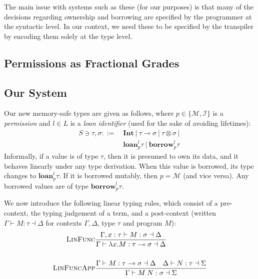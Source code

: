 \documentclass{article}
\renewcommand\em{\bfseries}
\newcommand{\agap}{\hspace{0.25em}}
\newcommand{\lolly}{\multimap}
\newcommand{\judge}[3]{\textsc{#1}&\frac{#2}{#3}}
\newcommand{\loan}{\textbf{loan}}
\newcommand{\borrow}{\textbf{borrow}}
\begin{document}

The main issue with systems such as these (for our purposes) is that many of the decisions regarding ownership and borrowing are specified by the programmer at the syntactic level. In our context, we need these to be specified by the transpiler by encoding them solely at the type level. 



\subsection{Permissions as Fractional Grades}

\subsection{Our System}

Our new memory-safe types are given as follows, where $p \in \{\mathcal{M}, \mathcal{I} \}$ is a \emph{permission} and $l \in L$ is a \emph{loan identifier} (used for the sake of avoiding lifetimes):
\begin{align*}
    S \ni \tau, \sigma ::=~  &\textbf{Int} ~|~ \tau \lolly \sigma ~|~ \tau \otimes \sigma ~|~ \\
    & \loan^{l}_{p} \tau ~|~ \borrow^{l}_{p} \tau
\end{align*}
Informally, if a value is of type $\tau$, then it is presumed to own its data, and it behaves linearly under any type derivation. When this value is borrowed, its type changes to $\loan_{p}^{l} \tau$. If it is borrowed mutably, then $p = \mathcal{M}$ (and vice versa). Any borrowed values are of type $\borrow_{p}^{l} \tau$. 

We now introduce the following linear typing rules, which consist of a pre-context, the typing judgement of a term, and a post-context (written $\Gamma \vdash M : \tau \dashv \Delta$ for contexts $\Gamma, \Delta$, type $\tau$ and program $M$):
\begin{align*}
    \judge{LinFunc}{\Gamma, x : \tau \vdash M : \sigma \dashv \Delta}{ \Gamma \vdash \lambda x . M : \tau \lolly \sigma \dashv \Delta}\\
    ~\\
    \judge{LinFuncApp}{\Gamma \vdash M : \tau \lolly \sigma \dashv \Delta \hspace{1em} \Delta \vdash N : \tau \dashv \Sigma}{\Gamma \vdash M \agap N : \sigma \dashv \Sigma }\\
\end{align*}






\renewcommand\em{\it}
\printbibliography[title={References}]
\end{document}
